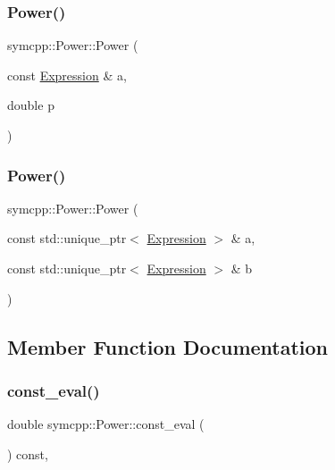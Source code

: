 \subsubsection{\texorpdfstring{Power()}{Power()}\hspace{0.1cm}{\footnotesize\ttfamily [2/3]}}
{\footnotesize\ttfamily symcpp\+::\+Power\+::\+Power (\begin{DoxyParamCaption}\item[{const \mbox{\hyperlink{classsymcpp_1_1Expression}{Expression}} \&}]{a,  }\item[{double}]{p }\end{DoxyParamCaption})}

\mbox{\label{classsymcpp_1_1Power_a5c32ae8501d643bbbe846f08563bac44}} 
\subsubsection{\texorpdfstring{Power()}{Power()}\hspace{0.1cm}{\footnotesize\ttfamily [3/3]}}
{\footnotesize\ttfamily symcpp\+::\+Power\+::\+Power (\begin{DoxyParamCaption}\item[{const std\+::unique\+\_\+ptr$<$ \mbox{\hyperlink{classsymcpp_1_1Expression}{Expression}} $>$ \&}]{a,  }\item[{const std\+::unique\+\_\+ptr$<$ \mbox{\hyperlink{classsymcpp_1_1Expression}{Expression}} $>$ \&}]{b }\end{DoxyParamCaption})}



\subsection{Member Function Documentation}
\mbox{\label{classsymcpp_1_1Power_ac344573e85b3db4a324ba3635244c8ca}} 
\subsubsection{\texorpdfstring{const\_eval()}{const\_eval()}}
{\footnotesize\ttfamily double symcpp\+::\+Power\+::const\+\_\+eval (\begin{DoxyParamCaption}{ }\end{DoxyParamCaption}) const\hspace{0.3cm}{\ttfamily [override]}, {\ttfamily [virtual]}}



